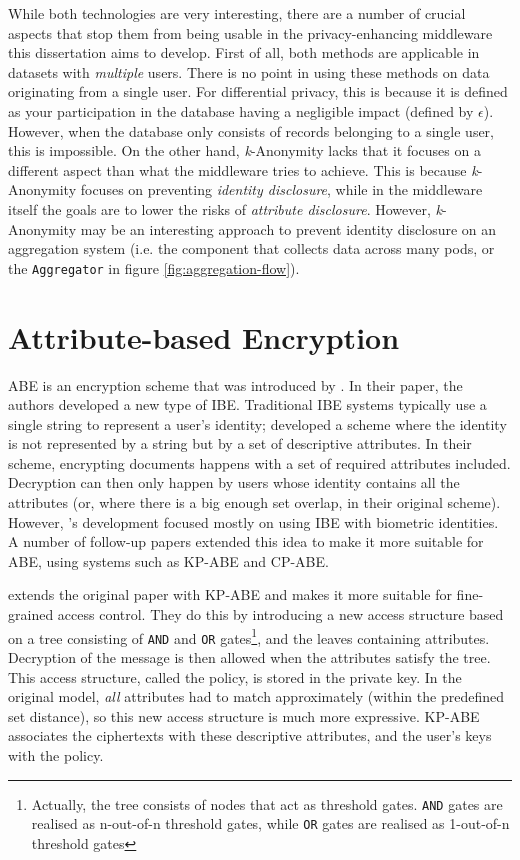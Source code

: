 While both technologies are very interesting, there are a number of crucial aspects that stop them from being usable in the privacy-enhancing middleware this dissertation aims to develop. First of all, both methods are applicable in datasets with \textit{multiple} users. There is no point in using these methods on data originating from a single user. For differential privacy, this is because it is defined as your participation in the database having a negligible impact (defined by $\epsilon$). However, when the database only consists of records belonging to a single user, this is impossible. On the other hand, \textit{k}-Anonymity lacks that it focuses on a different aspect than what the middleware tries to achieve. This is because \textit{k}-Anonymity focuses on preventing \textit{identity disclosure}, while in the middleware itself the goals are to lower the risks of \textit{attribute disclosure}. However, \textit{k}-Anonymity may be an interesting approach to prevent identity disclosure on an aggregation system (i.e. the component that collects data across many pods, or the \texttt{Aggregator} in figure \ref{fig:aggregation-flow}).

\section{Attribute-based Encryption}
\Gls{ABE} is an encryption scheme that was introduced by \citet*{fuzzy-ibe}. In their paper, the authors developed a new type of \gls{IBE}. Traditional \gls{IBE} systems typically use a single string to represent a user's identity; \citeauthor*{fuzzy-ibe} developed a scheme where the identity is not represented by a string but by a set of descriptive attributes. In their scheme, encrypting documents happens with a set of required attributes included. Decryption can then only happen by users whose identity contains all the attributes (or, where there is a big enough set overlap, in their original scheme). However, \citeauthor*{fuzzy-ibe}'s development focused mostly on using \gls{IBE} with biometric identities. A number of follow-up papers extended this idea to make it more suitable for \gls{ABE}, using systems such as \gls{KP-ABE} and \gls{CP-ABE}.

\citet{kp-abe} extends the original paper with \gls{KP-ABE} and makes it more suitable for fine-grained access control. They do this by introducing a new access structure based on a tree consisting of \texttt{AND} and \texttt{OR} gates\footnote{Actually, the tree consists of nodes that act as threshold gates. \texttt{AND} gates are realised as n-out-of-n threshold gates, while \texttt{OR} gates are realised as 1-out-of-n threshold gates}, and the leaves containing attributes. Decryption of the message is then allowed when the attributes satisfy the tree. This access structure, called the policy, is stored in the private key. In the original model, \textit{all} attributes had to match approximately (within the predefined set distance), so this new access structure is much more expressive. \Gls{KP-ABE} associates the ciphertexts with these descriptive attributes, and the user's keys with the policy.

